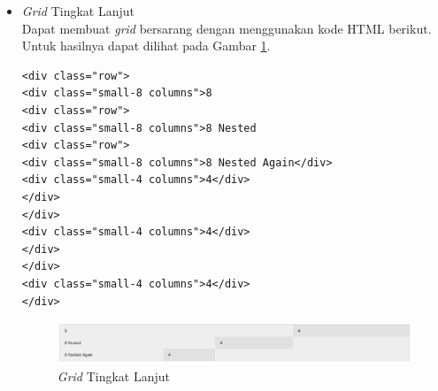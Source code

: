 \begin{enumerate}[(1)]
\begin{itemize}
\item {\it Grid} Tingkat Lanjut\\
Dapat membuat {\it grid} bersarang dengan menggunakan kode HTML berikut. Untuk hasilnya dapat dilihat pada Gambar \ref{fig:gridadv}.
\begin{lstlisting}[basicstyle=\footnotesize]
<div class="row">
<div class="small-8 columns">8
<div class="row">
<div class="small-8 columns">8 Nested
<div class="row">
<div class="small-8 columns">8 Nested Again</div>
<div class="small-4 columns">4</div>
</div>
</div>
<div class="small-4 columns">4</div>
</div>
</div>
<div class="small-4 columns">4</div>
</div>
\end{lstlisting}
\begin{figure}[H]
\centering
\includegraphics[scale=0.6]{Gambar/gridadv.png}
\caption[{\it Grid} Tingkat Lanjut]{{\it Grid} Tingkat Lanjut}
\label{fig:gridadv}
\end{figure}


\end{itemize}
\end{enumerate}
